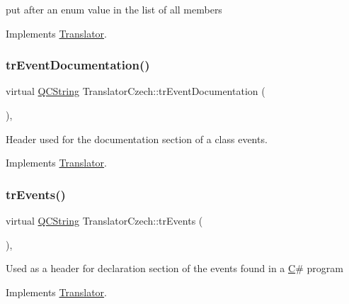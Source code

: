 put after an enum value in the list of all members 

Implements \mbox{\hyperlink{class_translator}{Translator}}.

\mbox{\label{class_translator_czech_a0644f7776c80bce90143f808f6299b7b}} 
\subsubsection{\texorpdfstring{trEventDocumentation()}{trEventDocumentation()}}
{\footnotesize\ttfamily virtual \mbox{\hyperlink{class_q_c_string}{Q\+C\+String}} Translator\+Czech\+::tr\+Event\+Documentation (\begin{DoxyParamCaption}{ }\end{DoxyParamCaption})\hspace{0.3cm}{\ttfamily [inline]}, {\ttfamily [virtual]}}

Header used for the documentation section of a class\textquotesingle{} events. 

Implements \mbox{\hyperlink{class_translator}{Translator}}.

\mbox{\label{class_translator_czech_a5411d69f698ce42fcca7d5ed3e9ae7ab}} 
\subsubsection{\texorpdfstring{trEvents()}{trEvents()}}
{\footnotesize\ttfamily virtual \mbox{\hyperlink{class_q_c_string}{Q\+C\+String}} Translator\+Czech\+::tr\+Events (\begin{DoxyParamCaption}{ }\end{DoxyParamCaption})\hspace{0.3cm}{\ttfamily [inline]}, {\ttfamily [virtual]}}

Used as a header for declaration section of the events found in a \mbox{\hyperlink{class_c}{C}}\# program 

Implements \mbox{\hyperlink{class_translator}{Translator}}.

\mbox{\label{class_translator_czech_a0b9ae5758daecc09ccc601d972f3fb79}} 
